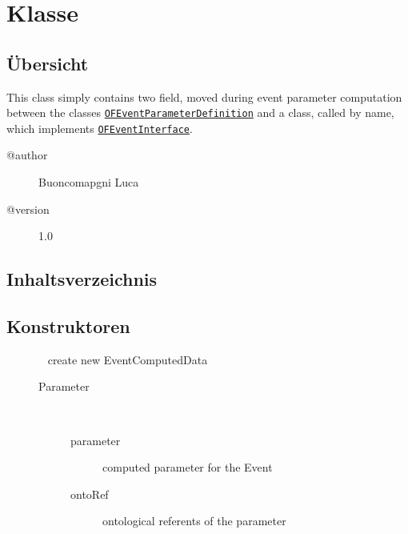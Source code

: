 
\section[EventComputedData]{Klasse }\label{ontologyFramework.OFEventManagement.EventComputedData-class}
\subsection{Übersicht}
This class simply contains two field, moved during event parameter computation
 between the classes \texttt{\hyperlink{ontologyFramework.OFEventManagement.OFEventParameterDefinition-class}{OFEventParameterDefinition}} and a
 class,  called by name, which implements \texttt{\hyperlink{ontologyFramework.OFEventManagement.OFLogicalEventManagement.OFEventInterface-class}{OFEventInterface}}.
\begin{description}
\item[@author] 
Buoncomapgni Luca
\item[@version] 
1.0
\end{description}
\subsection{Inhaltsverzeichnis}
\subsection{Konstruktoren}
\begin{description}
\item[{\label{ontologyFramework.OFEventManagement.EventComputedData(java.lang.Object,ontologyFramework.OFContextManagement.OWLReferences)}}]
~ create new EventComputedData
\begin{description}
\item[Parameter] ~
\begin{description}
\item[parameter]
computed parameter for the Event
\item[ontoRef]
ontological referents of the parameter
\end{description}
\end{description}
\end{description}
